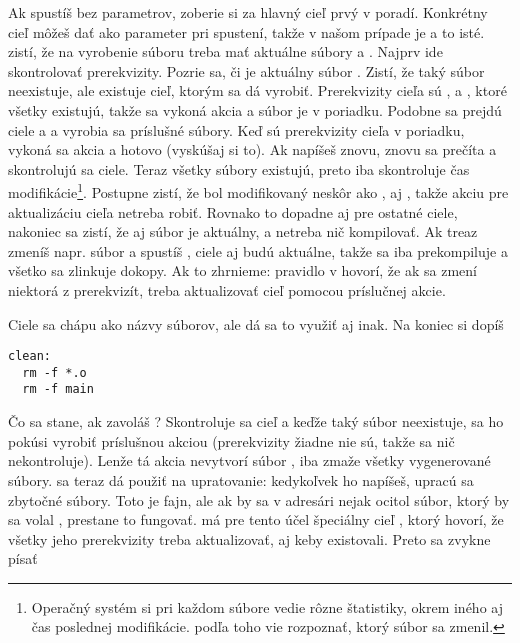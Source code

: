 Ak spustíš  bez parametrov, zoberie si za hlavný cieľ prvý v poradí.
Konkrétny cieľ môžeš dať ako parameter pri spustení, takže v našom prípade je
 a  to isté.  zistí, že na vyrobenie súboru
 treba mať aktuálne súbory   a .
Najprv ide skontrolovať prerekvizity. Pozrie sa, či je aktuálny súbor
. Zistí, že taký súbor neexistuje, ale existuje cieľ, ktorým sa dá
vyrobiť. Prerekvizity cieľa  sú ,  a
, ktoré všetky existujú, takže sa vykoná akcia  a súbor  je v poriadku. Podobne sa prejdú ciele 
a  a vyrobia sa príslušné súbory. Keď sú prerekvizity cieľa
 v poriadku, vykoná sa akcia 
a hotovo (vyskúšaj si to).  Ak napíšeš  znovu, znovu sa prečíta
 a skontrolujú sa ciele. Teraz všetky súbory existujú, preto
 iba skontroluje čas modifikácie\footnote{Operačný systém si pri
každom súbore vedie rôzne štatistiky, okrem iného aj čas poslednej modifikácie.
 podľa toho vie rozpoznať, ktorý súbor sa zmenil.}. Postupne zistí, že
 bol modifikovaný neskôr ako ,  aj
, takže akciu pre aktualizáciu cieľa  netreba robiť. 
Rovnako to dopadne aj pre ostatné ciele, nakoniec sa zistí, že aj súbor 
je aktuálny, a netreba nič kompilovať. Ak treaz zmeníš napr. súbor  a spustíš ,
ciele  aj  budú aktuálne, takže sa iba prekompiluje  
a všetko sa zlinkuje dokopy. Ak to zhrnieme: pravidlo v  hovorí, že ak
sa zmení niektorá z prerekvizít, treba aktualizovať cieľ pomocou príslučnej akcie.


Ciele sa chápu ako názvy súborov, ale dá sa to využiť aj inak. Na koniec  si dopíš

\begin{Verbatim}[frame=single]
clean:
  rm -f *.o
  rm -f main
\end{Verbatim}

Čo sa stane, ak zavoláš ? Skontroluje sa cieľ  a keďže taký súbor neexistuje,  sa ho pokúsi
vyrobiť príslušnou akciou (prerekvizity žiadne nie sú, takže sa nič nekontroluje). Lenže tá akcia nevytvorí súbor , iba 
zmaže všetky vygenerované súbory.  sa teraz dá použiť na upratovanie: kedykoľvek ho napíšeš, upracú sa zbytočné súbory.
Toto je fajn, ale ak by sa v adresári nejak ocitol súbor, ktorý by sa volal , prestane to fungovať.  má pre tento účel
špeciálny cieľ , ktorý hovorí, že všetky jeho prerekvizity treba aktualizovať, aj keby existovali. Preto sa zvykne písať

